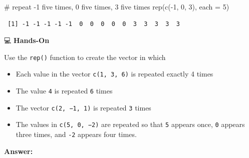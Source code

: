 \documentclass[
  letterpaper,
  DIV=11,
  numbers=noendperiod]{scrreprt}
\newenvironment{Shaded}{\begin{snugshade}}{\end{snugshade}}
\newcommand{\AttributeTok}[1]{\textcolor[rgb]{0.40,0.45,0.13}{#1}}
\newcommand{\CommentTok}[1]{\textcolor[rgb]{0.37,0.37,0.37}{#1}}
\newcommand{\DecValTok}[1]{\textcolor[rgb]{0.68,0.00,0.00}{#1}}
\newcommand{\FunctionTok}[1]{\textcolor[rgb]{0.28,0.35,0.67}{#1}}
\newcommand{\NormalTok}[1]{\textcolor[rgb]{0.00,0.23,0.31}{#1}}
\newcommand{\SpecialCharTok}[1]{\textcolor[rgb]{0.37,0.37,0.37}{#1}}
\begin{document}
\begin{Shaded}
\begin{Highlighting}[]
\CommentTok{\# repeat {-}1 five times, 0 five times, 3 five times}
\FunctionTok{rep}\NormalTok{(}\FunctionTok{c}\NormalTok{(}\SpecialCharTok{{-}}\DecValTok{1}\NormalTok{, }\DecValTok{0}\NormalTok{, }\DecValTok{3}\NormalTok{), }\AttributeTok{each =} \DecValTok{5}\NormalTok{)              }
\end{Highlighting}
\end{Shaded}

\begin{verbatim}
 [1] -1 -1 -1 -1 -1  0  0  0  0  0  3  3  3  3  3
\end{verbatim}

💻 \textbf{Hands-On}

Use the \texttt{rep()} function to create the vector in which

\begin{itemize}
\item
  Each value in the vector \texttt{c(1,\ 3,\ 6)} is repeated exactly 4
  times
\item
  The value \texttt{4} is repeated \texttt{6} times
\item
  The vector \texttt{c(2,\ −1,\ 1)} is repeated \texttt{3} times
\item
  The values in \texttt{c(5,\ 0,\ −2)} are repeated so that \texttt{5}
  appears once, \texttt{0} appears three times, and \texttt{-2} appears
  four times.
\end{itemize}

\textbf{Answer:}
\end{document}
